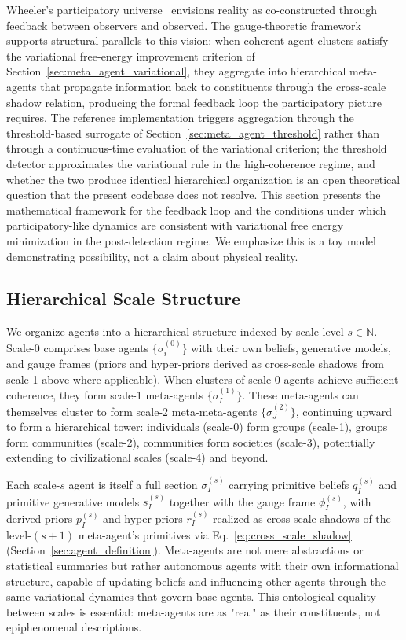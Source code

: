 \documentclass[11pt]{article}
\begin{document}
Wheeler's participatory universe~\cite{Wheeler1983} envisions reality as co-constructed through feedback between observers and observed. The gauge-theoretic framework supports structural parallels to this vision: when coherent agent clusters satisfy the variational free-energy improvement criterion of Section~\ref{sec:meta_agent_variational}, they aggregate into hierarchical meta-agents that propagate information back to constituents through the cross-scale shadow relation, producing the formal feedback loop the participatory picture requires. The reference implementation triggers aggregation through the threshold-based surrogate of Section~\ref{sec:meta_agent_threshold} rather than through a continuous-time evaluation of the variational criterion; the threshold detector approximates the variational rule in the high-coherence regime, and whether the two produce identical hierarchical organization is an open theoretical question that the present codebase does not resolve. This section presents the mathematical framework for the feedback loop and the conditions under which participatory-like dynamics are consistent with variational free energy minimization in the post-detection regime. We emphasize this is a toy model demonstrating possibility, not a claim about physical reality.

\subsection{Hierarchical Scale Structure}

We organize agents into a hierarchical structure indexed by scale level $s \in \mathbb{N}$. Scale-0 comprises base agents $\{\sigma_i^{(0)}\}$ with their own beliefs, generative models, and gauge frames (priors and hyper-priors derived as cross-scale shadows from scale-1 above where applicable). When clusters of scale-0 agents achieve sufficient coherence, they form scale-1 meta-agents $\{\sigma_I^{(1)}\}$. These meta-agents can themselves cluster to form scale-2 meta-meta-agents $\{\sigma_J^{(2)}\}$, continuing upward to form a hierarchical tower: individuals (scale-0) form groups (scale-1), groups form communities (scale-2), communities form societies (scale-3), potentially extending to civilizational scales (scale-4) and beyond.

Each scale-$s$ agent is itself a full section $\sigma_I^{(s)}$ carrying primitive beliefs $q_I^{(s)}$ and primitive generative models $s_I^{(s)}$ together with the gauge frame $\phi_I^{(s)}$, with derived priors $p_I^{(s)}$ and hyper-priors $r_I^{(s)}$ realized as cross-scale shadows of the level-$(s{+}1)$ meta-agent's primitives via Eq.~\eqref{eq:cross_scale_shadow} (Section~\ref{sec:agent_definition}). Meta-agents are not mere abstractions or statistical summaries but rather autonomous agents with their own informational structure, capable of updating beliefs and influencing other agents through the same variational dynamics that govern base agents. This ontological equality between scales is essential: meta-agents are as "real" as their constituents, not epiphenomenal descriptions.
\end{document}
